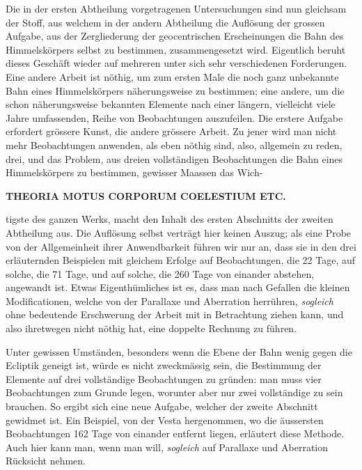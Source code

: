 Die in der ersten Abtheilung vorgetragenen Untersuchungen sind nun gleichsam der Stoff, aus welchem in der andern Abtheilung die Auflösung der grossen Aufgabe, aus der Zergliederung der geocentrischen Erscheinungen die Bahn des Himmelskörpers selbst zu bestimmen, zusammengesetzt wird. Eigentlich beruht dieses Geschäft wieder auf mehreren unter sich sehr verschiedenen Forderungen. Eine andere Arbeit ist nöthig, um zum ersten Male die noch ganz unbekannte Bahn eines Himmelskörpers näherungsweise zu bestimmen; eine andere, um die schon näherungsweise bekannten Elemente nach einer längern, vielleicht viele Jahre umfassenden, Reihe von Beobachtungen auszufeilen. Die erstere Aufgabe erfordert grössere Kunst, die andere grössere Arbeit. Zu jener wird man nicht mehr Beobachtungen anwenden, als eben nöthig sind, also, allgemein zu reden, drei, und das Problem, aus dreien vollständigen Beobachtungen die Bahn eines Himmelskörpers zu bestimmen, gewisser Maassen das Wich-
\par\clearpage
\thispagestyle{empty}
\noindent{}%
\makebox[12mm][l]{}%
\parbox[t]{\dimexpr\linewidth-24mm\relax}{\centering\footnotesize\bfseries THEORIA MOTUS CORPORUM COELESTIUM ETC.\par}%
\par\nobreak\medskip
\noindent tigste des ganzen Werks, macht den Inhalt des ersten Abschnitts der zweiten
Abtheilung aus. Die Auflösung selbst verträgt hier keinen Auszug; als eine
Probe von der Allgemeinheit ihrer Anwendbarkeit führen wir nur an, dass sie
in den drei erläuternden Beispielen mit gleichem Erfolge auf Beobachtungen,
die 22 Tage, auf solche, die 71 Tage, und auf solche, die 260 Tage von einander
abstehen, angewandt ist. Etwas Eigenthümliches ist es, dass man nach
Gefallen die kleinen Modificationen, welche von der Parallaxe und Aberration
herrühren, \textit{sogleich} ohne bedeutende Erschwerung der Arbeit mit in Betrachtung
ziehen kann, und also ihretwegen nicht nöthig hat, eine doppelte Rechnung zu
führen.

Unter gewissen Umständen, besonders wenn die Ebene der Bahn wenig
gegen die Ecliptik geneigt ist, würde es nicht zweckmässig sein, die Bestimmung
der Elemente auf drei vollständige Beobachtungen zu gründen: man muss
vier Beobachtungen zum Grunde legen, worunter aber nur zwei vollständige zu
sein brauchen. So ergibt sich eine neue Aufgabe, welcher der zweite Abschnitt
gewidmet ist. Ein Beispiel, von der Vesta hergenommen, wo die äussersten Beobachtungen
162 Tage von einander entfernt liegen, erläutert diese Methode.
Auch hier kann man, wenn man will, \textit{sogleich} auf Parallaxe und Aberration
Rücksicht nehmen.

